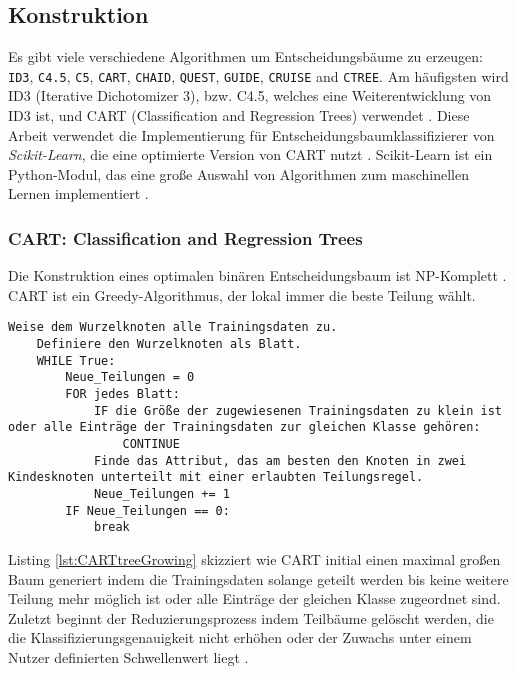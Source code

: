 \subsection{Konstruktion}
\label{sec:construction}
Es gibt viele verschiedene Algorithmen um Entscheidungsbäume zu erzeugen: \texttt{ID3}, \texttt{C4.5}, \texttt{C5}, \texttt{CART}, \texttt{CHAID}, \texttt{QUEST},
\texttt{GUIDE}, \texttt{CRUISE} and \texttt{CTREE}. Am häufigsten wird ID3 (Iterative Dichotomizer 3), bzw. C4.5, welches eine Weiterentwicklung von ID3 ist, und CART (Classification and Regression Trees) verwendet \cite{scikit-learn, singh2014comparative}.
Diese Arbeit verwendet die Implementierung für Entscheidungsbaumklassifizierer von \textit{Scikit-Learn}, die eine optimierte Version von CART nutzt \cite{ScikitLearnCART}. Scikit-Learn ist ein Python-Modul, das eine
große Auswahl von Algorithmen zum maschinellen Lernen implementiert \cite{scikit-learn}.

\subsubsection{CART: Classification and Regression Trees}
Die Konstruktion eines optimalen binären Entscheidungsbaum ist NP-Komplett \cite{laurent1976constructing}. CART ist ein Greedy-Algorithmus, der lokal immer die beste Teilung wählt.
\begin{lstlisting}[label=lst:CARTtreeGrowing,caption={Skizze von vereinfachten Baumwachstumsalgorithmus \cite{steinbergCART}.}]
    Weise dem Wurzelknoten alle Trainingsdaten zu.
    Definiere den Wurzelknoten als Blatt.
    WHILE True:
        Neue_Teilungen = 0
        FOR jedes Blatt:
            IF die Größe der zugewiesenen Trainingsdaten zu klein ist oder alle Einträge der Trainingsdaten zur gleichen Klasse gehören:
                CONTINUE
            Finde das Attribut, das am besten den Knoten in zwei Kindesknoten unterteilt mit einer erlaubten Teilungsregel.
            Neue_Teilungen += 1
        IF Neue_Teilungen == 0:
            break
\end{lstlisting}
Listing \ref{lst:CARTtreeGrowing} skizziert wie CART initial einen maximal großen Baum generiert indem die Trainingsdaten solange geteilt werden bis keine weitere Teilung mehr möglich ist oder alle Einträge der gleichen
Klasse zugeordnet sind. Zuletzt beginnt der Reduzierungsprozess indem Teilbäume gelöscht werden, die die Klassifizierungsgenauigkeit nicht erhöhen oder der Zuwachs unter einem Nutzer definierten
Schwellenwert liegt \cite{steinbergCART}.
